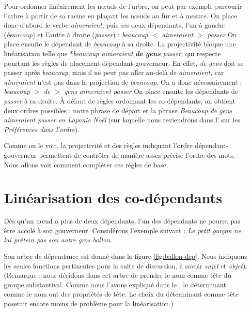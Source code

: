 Pour ordonner linéairement les nœuds de l’arbre, on peut par exemple parcourir l’arbre à partir de sa racine en plaçant les nœuds au fur et à mesure. On place donc d’abord le verbe \textit{aimeraient}, puis ses deux dépendants, l’un à gauche (\textit{beaucoup}) et l’autre à droite (\textit{passer}) :
\ea
    \textit{{beaucoup $<$ aimeraient $>$ passer}}
\z
On place ensuite le dépendant de \textit{beaucoup} à sa droite. La projectivité bloque une linéarisation telle que *\textit{beaucoup aimeraient} \textbf{\textit{de gens}} \textit{passer}, qui respecte pourtant les règles de placement dépendant-gouverneur. En effet, \textit{de gens} doit se passer après \textit{beaucoup}, mais il ne peut pas aller au-delà de \textit{aimeraient,} car \textit{aimeraient} n’est pas dans la projection de \textit{beaucoup}. On a donc nécessairement :
\ea
    \textit{{beaucoup $>$ de $>$ gens aimeraient passer}}
\z
On place ensuite les dépendants de \textit{passer} à sa droite. À défaut de règles ordonnant les co-dépendants, on obtient deux ordres possibles : notre phrase de départ et la phrase \textit{Beaucoup de gens aimeraient passer en Laponie Noël} (sur laquelle nous reviendrons dans l’ sur les \textit{Préférences dans l’ordre}).

Comme on le voit, la projectivité et des règles indiquant l’ordre dépendant-gouverneur permettent de contrôler de manière assez précise l’ordre des mots. Nous allons voir comment compléter ces règles de base.

\section{Linéarisation des co-dépendants}\label{sec:3.5.19}

Dès qu’un nœud a plus de deux dépendants, l’un des dépendants ne pourra pas être accolé à son gouverneur. Considérons l’exemple suivant :
\ea\label{ex:ballon}
\textit{{Le petit garçon ne lui prêtera pas son autre gros ballon}.}
\z

Son arbre de dépendance est donné dans la figure \ref{fig:ballon-dep}. Nous indiquons les seules fonctions pertinentes pour la suite de discussion, à savoir \textit{sujet} et \textit{objet}).
 (Remarque : nous décidons dans cet arbre de prendre le nom comme tête du groupe substantival. Comme nous l’avons expliqué dans le , le déterminant comme le nom ont des propriétés de tête. Le choix du déterminant comme tête poserait encore moins de problème pour la linéarisation.)


